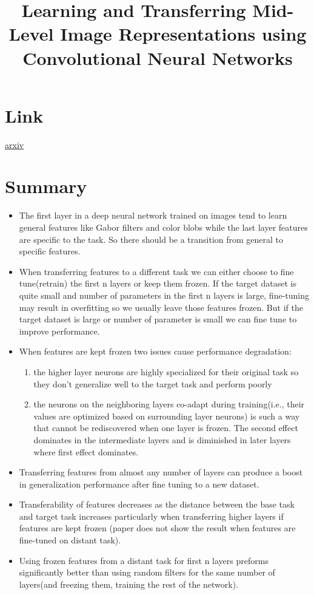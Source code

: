 \documentclass{article}
\title{Learning and Transferring Mid-Level Image Representations
using Convolutional Neural Networks}
\author{}
\date{}
\begin{document}
\maketitle

\section*{Link}
\href{https://arxiv.org/abs/1411.1792}{arxiv} 


\section*{Summary}
\begin{itemize}
    \item The first layer in a deep neural network trained on images tend to learn general features like Gabor filters and color blobs while the last layer features are specific to the task. So there should be a transition from general to specific features.
    \item When transferring features to a different task we can either choose to fine tune(retrain) the first n layers or keep them frozen. If the target dataset is quite small and number of parameters in the first n layers is large, fine-tuning may result in overfitting so we usually leave those features frozen. But if the target dataset is large or number of parameter is small we can fine tune to improve performance.
    \item When features are kept frozen two issues cause performance degradation: 
    \begin{enumerate}
        \item the higher layer neurons are highly specialized for their original task so they don't generalize well to the target task and perform poorly
        \item the neurons on the neighboring layers co-adapt during training(i.e., their values are optimized based on surrounding layer neurons) is such a way that cannot be rediscovered when one layer is frozen. The second effect dominates in the intermediate layers and is diminished in later layers where first effect dominates.
    \end{enumerate}
    \item Transferring features from almost any number of layers can produce a boost in generalization performance after fine tuning to a new dataset.
    \item Transferability of features decreases as the distance between the base task and target task increases particularly when transferring higher layers if features are kept frozen (paper does not show the result when features are fine-tuned on distant task).
    \item Using frozen features from a distant task for first n layers preforms significantly better than using random filters for the same number of layers(and freezing them, training the rest of the network).
\end{itemize}
\end{document}
